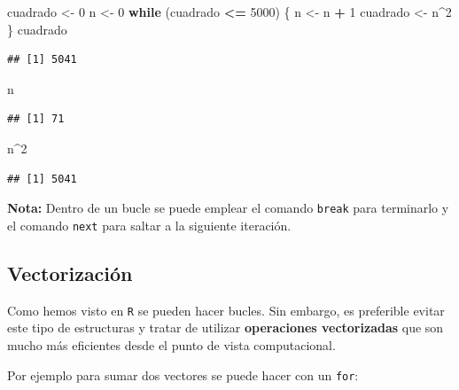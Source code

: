 \documentclass[]{book}
\newenvironment{Shaded}{\begin{snugshade}}{\end{snugshade}}
\newcommand{\ControlFlowTok}[1]{\textcolor[rgb]{0.13,0.29,0.53}{\textbf{#1}}}
\newcommand{\DecValTok}[1]{\textcolor[rgb]{0.00,0.00,0.81}{#1}}
\newcommand{\NormalTok}[1]{#1}
\newcommand{\OperatorTok}[1]{\textcolor[rgb]{0.81,0.36,0.00}{\textbf{#1}}}
\newcommand{\StringTok}[1]{\textcolor[rgb]{0.31,0.60,0.02}{#1}}
\begin{document}
\begin{Shaded}
\begin{Highlighting}[]
\NormalTok{cuadrado <-}\StringTok{ }\DecValTok{0}
\NormalTok{n <-}\StringTok{ }\DecValTok{0}
\ControlFlowTok{while}\NormalTok{ (cuadrado }\OperatorTok{<=}\StringTok{ }\DecValTok{5000}\NormalTok{) \{}
\NormalTok{  n <-}\StringTok{ }\NormalTok{n }\OperatorTok{+}\StringTok{ }\DecValTok{1}
\NormalTok{  cuadrado <-}\StringTok{ }\NormalTok{n}\OperatorTok{^}\DecValTok{2}
\NormalTok{\}}
\NormalTok{cuadrado}
\end{Highlighting}
\end{Shaded}

\begin{verbatim}
## [1] 5041
\end{verbatim}

\begin{Shaded}
\begin{Highlighting}[]
\NormalTok{n}
\end{Highlighting}
\end{Shaded}

\begin{verbatim}
## [1] 71
\end{verbatim}

\begin{Shaded}
\begin{Highlighting}[]
\NormalTok{n}\OperatorTok{^}\DecValTok{2}
\end{Highlighting}
\end{Shaded}

\begin{verbatim}
## [1] 5041
\end{verbatim}

\textbf{Nota:} Dentro de un bucle se puede emplear el comando \texttt{break} para terminarlo y el comando \texttt{next} para saltar a la siguiente iteración.

\hypertarget{vectorizacion}{%
\subsection{Vectorización}\label{vectorizacion}}

Como hemos visto en \texttt{R} se pueden
hacer bucles. Sin embargo, es preferible evitar este tipo de estructuras
y tratar de utilizar \textbf{operaciones vectorizadas} que son mucho más
eficientes desde el punto de vista computacional.

Por ejemplo para sumar dos vectores se puede hacer con un \texttt{for}:
\end{document}
